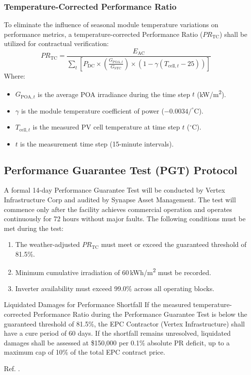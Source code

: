 \subsubsection{Temperature-Corrected Performance Ratio}
To eliminate the influence of seasonal module temperature variations on performance metrics, a temperature-corrected Performance Ratio ($PR_{\text{TC}}$) shall be utilized for contractual verification:
\begin{equation}
    PR_{\text{TC}} = \frac{E_{\text{AC}}}{\sum_{t} \left[ P_{\text{DC}} \times \left( \frac{G_{\text{POA}, t}}{G_{\text{STC}}} \right) \times \left( 1 - \gamma \left( T_{\text{cell}, t} - 25 \right) \right) \right]}
\end{equation}
Where:
\begin{itemize}
    \item $G_{\text{POA}, t}$ is the average POA irradiance during the time step $t$ (kW/m\textsuperscript{2}).
    \item $\gamma$ is the module temperature coefficient of power ($-0.0034/^\circ$C).
    \item $T_{\text{cell}, t}$ is the measured PV cell temperature at time step $t$ ($^\circ$C).
    \item $t$ is the measurement time step (15-minute intervals).
\end{itemize}

\subsection{Performance Guarantee Test (PGT) Protocol}
A formal 14-day Performance Guarantee Test will be conducted by Vertex Infrastructure Corp and audited by Synapse Asset Management. The test will commence only after the facility achieves commercial operation and operates continuously for 72 hours without major faults. The following conditions must be met during the test:
\begin{enumerate}
    \item The weather-adjusted $PR_{\text{TC}}$ must meet or exceed the guaranteed threshold of 81.5\%.
    \item Minimum cumulative irradiation of 60\,kWh/m\textsuperscript{2} must be recorded.
    \item Inverter availability must exceed 99.0\% across all operating blocks.
\end{enumerate}

\begin{warningbox}{Liquidated Damages for Performance Shortfall}
If the measured temperature-corrected Performance Ratio during the Performance Guarantee Test is below the guaranteed threshold of 81.5\%, the EPC Contractor (Vertex Infrastructure) shall have a cure period of 60 days. If the shortfall remains unresolved, liquidated damages shall be assessed at \$150,000 per 0.1\% absolute PR deficit, up to a maximum cap of 10\% of the total EPC contract price.
\end{warningbox}
Ref. \cite{synapse2023standard, anderson2024bifacial}.
